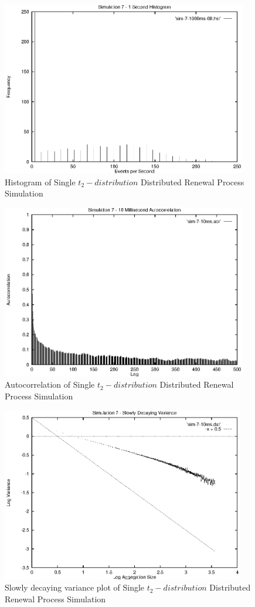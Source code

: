 \begin{figure}
\includegraphics[height=3in]{pics/sim-7-1s-hist-08.eps}
\caption{Histogram of Single $t_2-distribution$ Distributed Renewal Process Simulation}
\label{simulation:sim7.1s.hist}
\end{figure}

\begin{figure}
\includegraphics[height=3in]{pics/sim-7-10ms-acr.eps}
\caption{Autocorrelation of Single $t_2-distribution$ Distributed Renewal Process Simulation}
\label{simulation:sim7.10ms.acr}
\end{figure}

\begin{figure}
\includegraphics[height=3in]{pics/sim-7-10ms-sta.eps}
\caption{Slowly decaying variance plot of Single $t_2-distribution$ Distributed Renewal Process Simulation}
\label{simulation:sim7.10ms.sta}
\end{figure}

